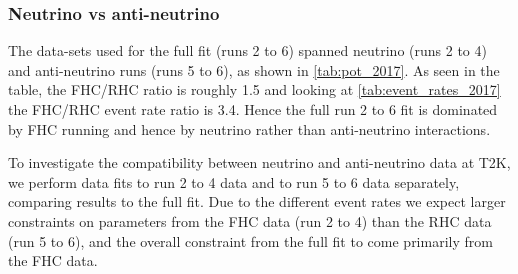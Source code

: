 \subsubsection{Neutrino vs anti-neutrino}
The data-sets used for the full fit (runs 2 to 6) spanned neutrino (runs 2 to 4) and anti-neutrino runs (runs 5 to 6), as shown in  \autoref{tab:pot_2017}. As seen in the table, the FHC/RHC ratio is roughly 1.5 and looking at \autoref{tab:event_rates_2017} the FHC/RHC event rate ratio is 3.4. Hence the full run 2 to 6 fit is dominated by FHC running and hence by neutrino rather than anti-neutrino interactions.

To investigate the compatibility between neutrino and anti-neutrino data at T2K, we perform data fits to run 2 to 4 data and to run 5 to 6 data separately, comparing results to the full fit. Due to the different event rates we expect larger constraints on parameters from the FHC data (run 2 to 4) than the RHC data (run 5 to 6), and the overall constraint from the full fit to come primarily from the FHC data. 

